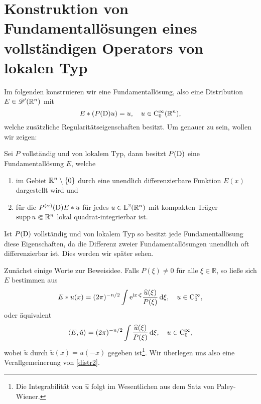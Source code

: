 \section{Konstruktion von Fundamentallösungen eines vollständigen Operators von lokalen Typ} %

Im folgenden konstruieren wir eine Fundamentallösung, also eine Distribution $E\in\mathscr D'(\mathbb R^n)$ mit
\begin{equation}
E*(P(\mathrm D) u) = u, \quad u \in \mathrm C_0^\infty(\mathbb R^n),
\end{equation}
welche zusätzliche Regularitätseigenschaften besitzt.
Um genauer zu sein,  wollen wir zeigen:
\begin{thm}\label{fundamental_exist}
Sei $P$ vollständig und von lokalem Typ, dann besitzt $P(\mathrm D)$ eine Fundamentallösung $E$, welche 
\begin{enumerate}
\item im Gebiet $\mathbb R^n\setminus\{0\}$  durch eine unendlich differenzierbare Funktion $E(x)$ dargestellt wird und
\item für die $P^{(\alpha)}(\mathrm D) E*u$ für jedes $u\in \mathrm L^2(\mathbb R^n)$ mit kompakten Träger $\operatorname{supp} u\Subset\mathbb R^n$ lokal quadrat-integrierbar ist. 
\end{enumerate}
\end{thm}
\begin{rem}
Ist $P(\mathrm D)$ vollständig und von lokalem Typ so besitzt jede Fundamentallösung diese Eigenschaften, da die Differenz zweier Fundamentallösungen unendlich oft differenzierbar ist. Dies werden wir später sehen.
\end{rem}

Zunächst einige Worte zur Beweisidee.  Falls $P(\xi)\neq 0$ für alle $\xi\in \mathbb R$, so ließe sich $E$ bestimmen aus
\begin{equation}\label{distr1}
E*u(x) = (2\pi)^{-n/2}\int \mathrm e^{\mathrm i x\cdot \xi} \frac{\widehat u(\xi)}{P(\xi)}\, \mathrm d\xi, \quad u \in \mathrm C_0^\infty,
\end{equation}
oder äquivalent
\begin{equation}\label{distr2}
\langle E,\check u\rangle = (2\pi)^{-n/2} \int \frac{\widehat u(\xi)}{P(\xi)}\, \mathrm d\xi, \quad u \in\mathrm C_0^\infty,
\end{equation}
wobei $\check u$ durch $\check u(x)=u(-x)$ gegeben ist\footnote{Die Integrabilität von $\widehat u$ folgt im Wesentlichen aus dem Satz von Paley-Wiener.}. Wir überlegen uns also eine Verallgemeinerung von \eqref{distr2}. 

